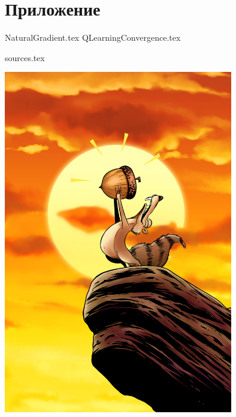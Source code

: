 \documentclass[a4paper, 10pt, oneside]{memoir}
\begin{document}
\newpage

\appendix

\chapter{Приложение}

{NaturalGradient.tex}
{QLearningConvergence.tex}

{sources.tex}

\newpage
\thispagestyle{empty}
\begin{center}
\vspace*{5cm}
\includegraphics[width=10cm]{Images/reach.png}
\end{center}
\end{document}

